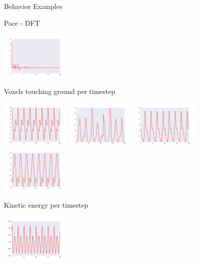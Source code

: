 \documentclass{beamer}
\begin{document}
\begin{frame}[allowframebreaks]{Behavior Examples}
\begin{minipage}{\textwidth}
\begin{block}{Pace - DFT}
\begin{center}
\includegraphics[width=0.25\textwidth]{../Figures/Behaviors/33.pdf}
\end{center}
\end{block}
\end{minipage}

\begin{minipage}{\textwidth}
\begin{block}{Voxels touching ground per timestep}
\begin{center}
\includegraphics[width=0.25\textwidth]{../Figures/Behaviors/40.pdf}
\includegraphics[width=0.25\textwidth]{../Figures/Behaviors/41.pdf}
\includegraphics[width=0.25\textwidth]{../Figures/Behaviors/42.pdf}
\includegraphics[width=0.25\textwidth]{../Figures/Behaviors/43.pdf}
\end{center}
\end{block}
\begin{block}{Kinetic energy per timestep}
\begin{center}
\includegraphics[width=0.25\textwidth]{../Figures/Behaviors/50.pdf}

\end{center}
\end{block}
\end{minipage}
\end{frame}
\end{document}
